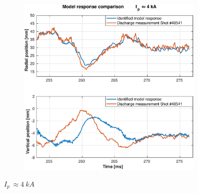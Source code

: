 \begin{figure}
\begin{subfigure}[b]{0.55\textwidth}
		\includegraphics[width=\textwidth]{Chp5/SimResp_541.eps}        
		\caption{\label{SimResp541}}
	\end{subfigure}
	\caption{$I_p~\approx 4~kA$ \label{SimResp_pos}}
\end{figure}


